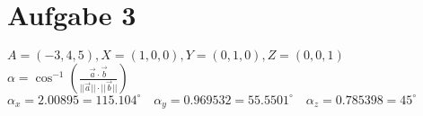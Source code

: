 \documentclass[a4paper,12pt]{article}
\begin{document}
\section{Aufgabe 3}
$A=(-3,4,5), X=(1,0,0), Y=(0,1,0), Z=(0,0,1)$\\
$\alpha = \cos^{-1}(\frac{\vec{a} \cdot \vec{b}}{||\vec{a}|| \cdot ||\vec{b}||})$\\
$\alpha_x = 2.00895 = 115.104^\circ \quad
\alpha_y = 0.969532 = 55.5501^\circ \quad
\alpha_z = 0.785398 = 45^\circ$
\end{document}

